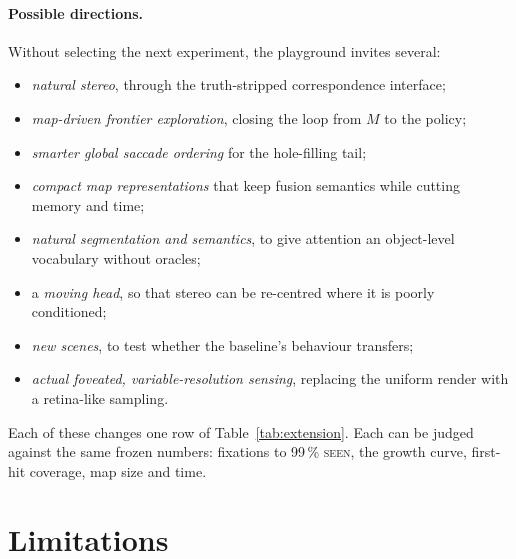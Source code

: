 \documentclass[11pt,a4paper]{article}
\newcommand{\pct}[1]{#1\,\%}
\begin{document}
\paragraph{Possible directions.} Without selecting the next experiment, the playground invites several:
\begin{itemize}
  \item \emph{natural stereo}, through the truth-stripped correspondence interface;
  \item \emph{map-driven frontier exploration}, closing the loop from $M$ to the policy;
  \item \emph{smarter global saccade ordering} for the hole-filling tail;
  \item \emph{compact map representations} that keep fusion semantics while cutting memory and time;
  \item \emph{natural segmentation and semantics}, to give attention an object-level vocabulary without oracles;
  \item a \emph{moving head}, so that stereo can be re-centred where it is poorly conditioned;
  \item \emph{new scenes}, to test whether the baseline's behaviour transfers;
  \item \emph{actual foveated, variable-resolution sensing}, replacing the uniform render with a retina-like sampling.
\end{itemize}
Each of these changes one row of Table~\ref{tab:extension}. Each can be judged against the same frozen numbers:
fixations to \pct{99} \textsc{seen}, the growth curve, first-hit coverage, map size and time.

\section{Limitations}\label{sec:limitations}
\end{document}
